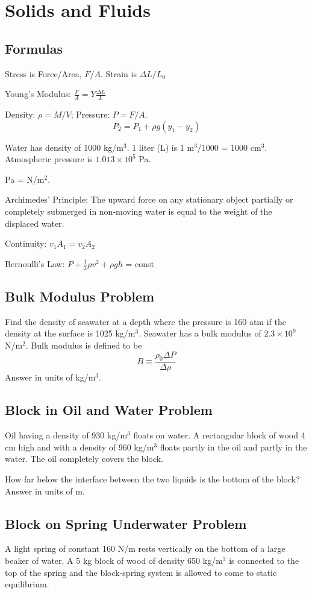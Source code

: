 \documentclass[../physics12.tex]{subfiles}
\begin{document}
\chapter{Solids and Fluids}
\section{Formulas}
Stress is Force/Area, $F/A$. Strain is $\Delta L/L_0$

Young's Modulus: $\frac{F}{A}=Y\frac{\Delta L}{L}$

Density: $\rho = M/V$; Pressure: $P=F/A$.
\[ P_2 = P_1 + \rho g(y_1-y_2)\]

Water has density of 1000 kg/m$^3$. 1 liter (L) is 1 m$^3$/1000 = 1000 cm$^3$. Atmospheric pressure is $1.013\times 10^5$ Pa.

Pa = N/m$^2$.

Archimedes' Principle: The upward force on any stationary object partially or completely submerged in non-moving water is equal to the weight of the displaced water.

Continuity: $v_1A_1=v_2A_2$

Bernoulli's Law: $P+\frac{1}{2}\rho v^2+\rho gh$ = const

\section{Bulk Modulus Problem}
Find the density of seawater at a depth where the pressure is 160 atm if the density at the surface is 1025 kg/m$^3$. Seawater 
has a bulk modulus of $2.3\times 10^9$ N/m$^2$. Bulk modulus is defined to be 
\[ B \equiv \frac{\rho_0\Delta P}{\Delta \rho}\]
Answer in units of kg/m$^3$.

\section{Block in Oil and Water Problem}
Oil having a density of 930 kg/m$^3$ floats on water. A rectangular block of wood 4 cm high and with a density of 960 kg/m$^3$ floats partly in the oil and partly in the water.
The oil completely covers the block.

How far below the interface between the two liquids is the bottom of the block? Answer in units of m.

\section{Block on Spring Underwater Problem}
A light spring of constant 160 N/m rests vertically on the bottom of a large beaker of water. A 5 kg block of wood of density 650 kg/m$^3$ is connected to the top of the spring 
and the block-spring system is allowed to come to static equilibrium.
\end{document}
